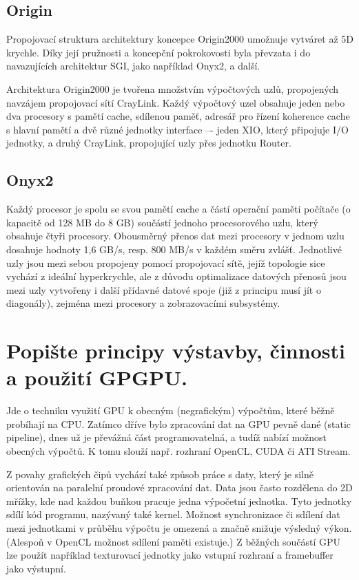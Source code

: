 	\subsection*{Origin}
		Propojovací struktura architektury koncepce Origin2000 umožnuje vytváret až 5D krychle. Díky její pružnosti a koncepční pokrokovosti byla převzata i do navazujících architektur SGI, jako například Onyx2, a další.
		
		Architektura Origin2000 je tvořena množstvím výpočtových uzlů, propojených navzájem propojovací sítí CrayLink. Každý výpočtový uzel obsahuje jeden nebo dva procesory s pamětí cache, sdílenou paměť, adresář pro řízení koherence cache s hlavní pamětí a dvě různé jednotky interface –- jeden XIO, který připojuje I/O jednotky, a druhý CrayLink, propojující uzly přes jednotku Router.

	\subsection*{Onyx2}
		Každý procesor je spolu se svou pamětí cache a částí operační paměti počítače (o kapacitě od 128 MB do 8 GB) součástí jednoho procesorového uzlu, který obsahuje čtyři procesory. Obousměrný přenos dat mezi procesory v jednom uzlu dosahuje hodnoty 1,6 GB/s, resp. 800 MB/s v každém směru zvlášť. Jednotlivé uzly jsou mezi sebou propojeny pomocí propojovací sítě, jejíž topologie sice vychází z ideální hyperkrychle, ale z důvodu optimalizace datových přenosů jsou mezi uzly vytvořeny i další přídavné datové spoje (již z principu musí jít o diagonály), zejména mezi procesory a zobrazovacími subsystémy.
	

\section{Popište principy výstavby, činnosti a použití GPGPU.}
	Jde o techniku využití GPU k obecným (negrafickým) výpočtům, které běžně probíhají na CPU. Zatímco dříve bylo zpracování dat na GPU pevně dané (static pipeline), dnes už je převážná část programovatelná, a tudíž nabízí možnost obecných výpočtů. K tomu slouží např. rozhraní OpenCL, CUDA či ATI Stream.
	
	Z povahy grafických čipů vychází také způsob práce s daty, který je silně orientován na paralelní proudové zpracování dat. Data jsou často rozdělena do 2D mřížky, kde nad každou buňkou pracuje jedna výpočetní jednotka. Tyto jednotky sdílí kód programu, nazývaný také kernel. Možnost synchronizace či sdílení dat mezi jednotkami v průběhu výpočtu je omezená a značně snižuje výsledný výkon. (Alespoň v OpenCL možnost sdílení paměti existuje.) Z běžných součástí GPU lze použít například texturovací jednotky jako vstupní rozhraní a framebuffer jako výstupní.
	
